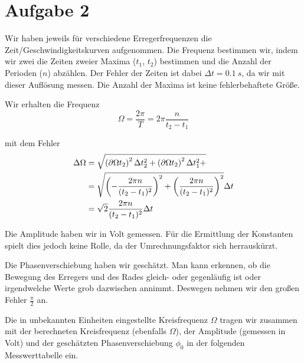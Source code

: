 \documentclass[a4paper,german,12pt,smallheadings]{scrartcl}
\begin{document}
\section{Aufgabe 2}
Wir haben jeweils für verschiedene Erregerfrequenzen die
Zeit/Geschwindigkeitskurven aufgenommen. Die Frequenz bestimmen wir, indem wir
zwei die Zeiten zweier Maxima ($t_1$, $t_2$) bestimmen und die Anzahl der
Perioden ($n$) abzählen. Der Fehler der Zeiten ist dabei $\Delta t =
\SI{0.1}{s}$, da wir mit dieser Auflösung messen. Die Anzahl der Maxima ist
keine fehlerbehaftete Größe.

Wir erhalten die Frequenz
\begin{equation}
  \Omega = \frac{2 \pi}{T} = 2 \pi \frac{n}{t_2 - t_1}
\end{equation}

mit dem Fehler
\begin{align}
  \Delta \Omega &= \sqrt{
    \del{\partial{\Omega}{t_2}}^2 \Delta t_2^2 +
    \del{\partial{\Omega}{t_2}}^2 \Delta t_1^2 +
  } \\
  &= \sqrt{
    \del{-\frac{2 \pi n}{(t_2 - t_1)^2}}^2 +
    \del{\frac{2 \pi n}{(t_2 - t_1)^2}}^2
  } \Delta t \\
  &= \sqrt{2} \frac{2 \pi n}{(t_2 - t_1)^2} \Delta t
\end{align}

Die Amplitude haben wir in Volt gemessen. Für die Ermittlung der Konstanten
spielt dies jedoch keine Rolle, da der Umrechnungsfaktor sich herrauskürzt.

Die Phasenverschiebung haben wir geschätzt. Man kann erkennen, ob die Bewegung
des Erregers und des Rades gleich- oder gegenläufig ist oder irgendwelche Werte
grob dazwischen annimmt. Deswegen nehmen wir den großen Fehler $\frac{\pi}{2}$ an.

Die in unbekannten Einheiten eingestellte Kreisfrequenz $\Omega$ tragen wir
zusammen mit der berechneten Kreisfrequenz (ebenfalls $\Omega$), der Amplitude
(gemessen in Volt) und der geschätzten Phasenverschiebung $\phi_0$ in der
folgenden Messwerttabelle ein.
\end{document}
